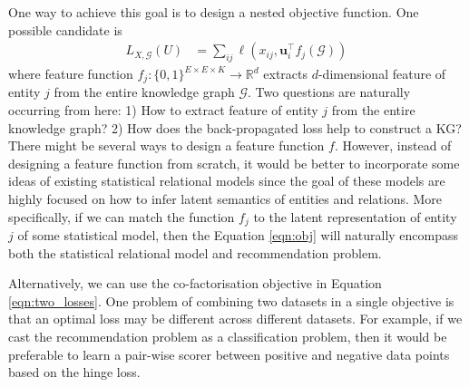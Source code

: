 \documentclass{article} %
\theoremstyle{definition}
\newcommand\ts{\mathcal} %
\newcommand\mt{} %
\newcommand\vt{\mathbf} %
\newcommand\fn{} %
\begin{document}
One way to achieve this goal is to design a nested objective function. One possible candidate is
\begin{align}
\label{eqn:obj}
L_{X, \ts{G}}(\mt{U}) & = \sum_{ij}\ell(x_{ij}, \vt{u}_{i}^\top \fn{f}_j(\ts{G}))
\end{align}
where feature function $\fn{f}_j : \{0,1\}^{E\times E\times K} \rightarrow \mathbb{R}^d$ extracts $d$-dimensional feature of entity $j$ from the entire knowledge graph $\ts{G}$. Two questions are naturally occurring from here: 1) How to extract feature of entity $j$ from the entire knowledge graph? 2) How does the back-propagated loss help to construct a KG? 
There might be several ways to design a feature function $f$. However, instead of designing a feature function from scratch, it would be better to incorporate some ideas of existing statistical relational models since the goal of these models are highly focused on how to infer latent semantics of entities and relations. More specifically, if we can match the function $f_j$ to the latent representation of entity $j$ of some statistical model, then the Equation \ref{eqn:obj} will naturally encompass both the statistical relational model and recommendation problem.

Alternatively, we can use the co-factorisation objective in Equation \ref{eqn:two_losses}. One problem of combining two datasets in a single objective is that an optimal loss may be different across different datasets. For example, if we cast the recommendation problem as a classification problem, then it would be preferable to learn a pair-wise scorer between positive and negative data points based on the hinge loss.
\end{document}
